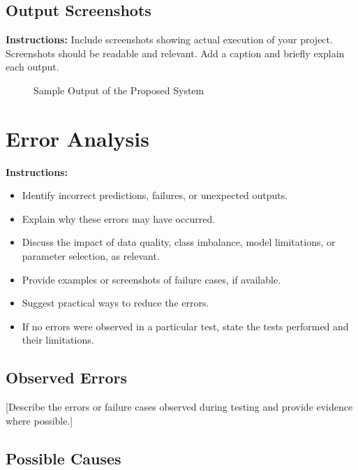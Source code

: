 \documentclass[12pt,a4paper]{report}
\begin{document}
\section{Output Screenshots}

\textbf{Instructions:}
Include screenshots showing actual execution of your project.
Screenshots should be readable and relevant. Add a caption
and briefly explain each output.

\begin{figure}[H]
\centering
{}
\caption{Sample Output of the Proposed System}
\label{fig:output}
\end{figure}

\chapter{Error Analysis}

\textbf{Instructions:}
\begin{itemize}
    \item Identify incorrect predictions, failures, or unexpected outputs.
    \item Explain why these errors may have occurred.
    \item Discuss the impact of data quality, class imbalance,
    model limitations, or parameter selection, as relevant.
    \item Provide examples or screenshots of failure cases, if available.
    \item Suggest practical ways to reduce the errors.
    \item If no errors were observed in a particular test,
    state the tests performed and their limitations.
\end{itemize}

\section{Observed Errors}

[Describe the errors or failure cases observed during
testing and provide evidence where possible.]

\section{Possible Causes}
\end{document}
